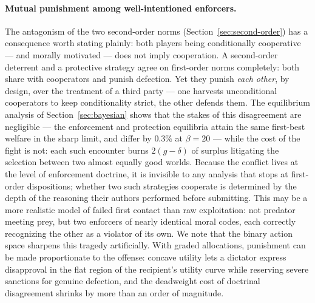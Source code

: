 \documentclass[11pt]{article}
\begin{document}

\paragraph{Mutual punishment among well-intentioned enforcers.}
The antagonism of the two second-order norms
(Section~\ref{sec:second-order}) has a consequence worth stating
plainly: both players being conditionally cooperative --- and morally
motivated --- does not imply cooperation.
A second-order deterrent and a protective strategy agree on
first-order norms completely: both share with cooperators and punish
defection.
Yet they punish \emph{each other}, by design, over the treatment of a
third party --- one harvests unconditional cooperators to keep
conditionality strict, the other defends them.
The equilibrium analysis of Section~\ref{sec:bayesian} shows that the
stakes of this disagreement are negligible --- the enforcement and
protection equilibria attain the same first-best welfare in the sharp
limit, and differ by $0.3\%$ at $\beta = 20$ --- while the cost of the
fight is not: each such encounter burns $2(g - \delta)$ of surplus
litigating the selection between two almost equally good worlds.
Because the conflict lives at the level of enforcement doctrine, it is
invisible to any analysis that stops at first-order dispositions;
whether two such strategies cooperate is determined by the depth of
the reasoning their authors performed before submitting.
This may be a more realistic model of failed first contact than raw
exploitation: not predator meeting prey, but two enforcers of nearly
identical moral codes, each correctly recognizing the other as a
violator of its own.
We note that the binary action space sharpens this tragedy
artificially.
With graded allocations, punishment can be made proportionate to the
offense: concave utility lets a dictator express disapproval in the
flat region of the recipient's utility curve while reserving severe
sanctions for genuine defection, and the deadweight cost of doctrinal
disagreement shrinks by more than an order of magnitude.
\end{document}
